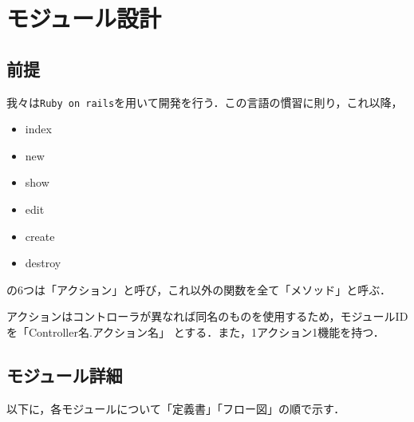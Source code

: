 \chapter{モジュール設計}
\section{前提}
我々は\texttt{Ruby on rails}を用いて開発を行う．この言語の慣習に則り，これ以降，
\begin{itemize}
    \item index
    \item new
    \item show
    \item edit
    \item create
    \item destroy
\end{itemize}
の6つは「アクション」と呼び，これ以外の関数を全て「メソッド」と呼ぶ．\par
アクションはコントローラが異なれば同名のものを使用するため，モジュールIDを「Controller名.アクション名」
とする．また，1アクション1機能を持つ．

\section{モジュール詳細}
以下に，各モジュールについて「定義書」「フロー図」の順で示す．



